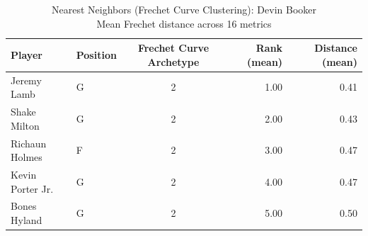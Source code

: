 \begin{table}[t]
\caption*{
{\fontsize{20}{25} Nearest Neighbors (Frechet Curve Clustering): Devin Booker\fontsize{12}{15}\selectfont } \\ 
{\fontsize{14}{17}\selectfont  Mean Frechet distance across 16 metrics\fontsize{12}{15}\selectfont }
} 
\fontsize{12.0pt}{14.0pt}\selectfont
\begin{tabular*}{\linewidth}{@{\extracolsep{\fill}}llcrr}
\toprule
Player & Position & Frechet Curve Archetype & Rank (mean) & Distance (mean) \\ 
\midrule\addlinespace[2.5pt]
Jeremy Lamb & G & 2 & 1.00 & 0.41 \\ 
Shake Milton & G & 2 & 2.00 & 0.43 \\ 
Richaun Holmes & F & 2 & 3.00 & 0.47 \\ 
Kevin Porter Jr. & G & 2 & 4.00 & 0.47 \\ 
Bones Hyland & G & 2 & 5.00 & 0.50 \\ 
\bottomrule
\end{tabular*}
\end{table}

